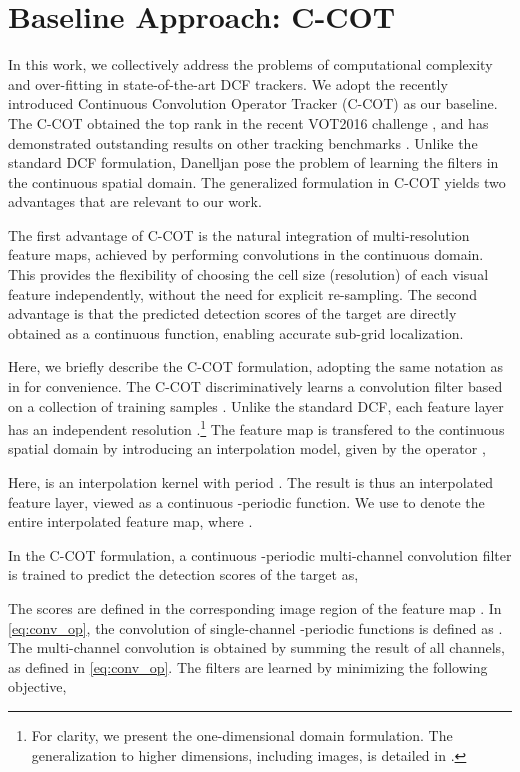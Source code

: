 \documentclass[10pt,twocolumn,letterpaper]{article}
\begin{document}
\section{Baseline Approach: C-COT}
\label{sec:CCOT}

In this work, we collectively address the problems of computational complexity and over-fitting in state-of-the-art DCF trackers. We adopt the recently introduced Continuous Convolution Operator Tracker (C-COT) \cite{DanelljanECCV2016} as our baseline. The C-COT obtained the top rank in the recent VOT2016 challenge \cite{VOT2016}, and has demonstrated outstanding results on other tracking benchmarks \cite{TempleColor,OTB2015}. Unlike the standard DCF formulation, Danelljan \etal \cite{DanelljanECCV2016} pose the problem of learning the filters in the continuous spatial domain. The generalized formulation in C-COT yields two advantages that are relevant to our work.

The first advantage of C-COT is the natural integration of multi-resolution feature maps, achieved by performing convolutions in the continuous domain. This provides the flexibility of choosing the cell size (\ie resolution) of each visual feature independently, without the need for explicit re-sampling.
The second advantage is that the predicted detection scores of the target are directly obtained as a continuous function, enabling accurate sub-grid localization.


Here, we briefly describe the C-COT formulation, adopting the same notation as in \cite{DanelljanECCV2016} for convenience. The C-COT discriminatively learns a convolution filter based on a collection of  training samples . Unlike the standard DCF, each feature layer  has an independent resolution .\footnote{For clarity, we present the one-dimensional domain formulation. The generalization to higher dimensions, including images, is detailed in \cite{DanelljanECCV2016}.} The feature map is transfered to the continuous spatial domain  by introducing an interpolation model, given by the operator ,

Here,  is an interpolation kernel with period . The result  is thus an interpolated feature layer, viewed as a continuous -periodic function. We use  to denote the entire interpolated feature map, where .

In the C-COT formulation, a continuous -periodic multi-channel convolution filter  is trained to predict the detection scores  of the target as,

The scores are defined in the corresponding image region  of the feature map . In \eqref{eq:conv_op}, the convolution of single-channel -periodic functions is defined as . The multi-channel convolution  is obtained by summing the result of all channels, as defined in \eqref{eq:conv_op}. The filters are learned by minimizing the following objective,
\end{document}
